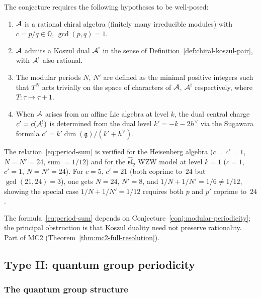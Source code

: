 \begin{remark}
\label{rem:precise-reflected-hypotheses}
The conjecture requires the following hypotheses to be well-posed:
\begin{enumerate}
\item $\mathcal{A}$ is a rational chiral algebra (finitely many irreducible modules) with $c = p/q \in \mathbb{Q}$, $\gcd(p,q) = 1$.
\item $\mathcal{A}$ admits a Koszul dual $\mathcal{A}^!$ in the sense of Definition~\ref{def:chiral-koszul-pair}, with $\mathcal{A}^!$ also rational.
\item The modular periods $N$, $N'$ are defined as the minimal positive integers such that $T^N$ acts trivially on the space of characters of $\mathcal{A}$, $\mathcal{A}^!$ respectively, where $T: \tau \mapsto \tau + 1$.
\item When $\mathcal{A}$ arises from an affine Lie algebra at level $k$, the dual central charge $c' = c(\mathcal{A}^!)$ is determined from the dual level $k' = -k - 2h^\vee$ via the Sugawara formula $c' = k'\dim(\mathfrak{g})/(k' + h^\vee)$.
\end{enumerate}
The relation~\eqref{eq:period-sum} is verified for the Heisenberg algebra ($c = c' = 1$, $N = N' = 24$, sum $= 1/12$) and for the $\widehat{\mathfrak{sl}}_2$ WZW model at level $k = 1$ ($c = 1$, $c' = 1$, $N = N' = 24$).  For $c = 5$, $c' = 21$ (both coprime to~$24$ but $\gcd(21, 24) = 3$), one gets $N = 24$, $N' = 8$, and $1/N + 1/N' = 1/6 \neq 1/12$, showing the special case $1/N + 1/N' = 1/12$ requires both $p$ and $p'$ coprime to~$24$.
\end{remark}

\begin{remark}[Scope]
The formula~\eqref{eq:period-sum} depends on Conjecture~\ref{conj:modular-periodicity}; the principal obstruction is that Koszul duality need not preserve rationality.  Part of MC2 (Theorem~\ref{thm:mc2-full-resolution}).
\end{remark}

\subsection{Type II: quantum group periodicity}

\subsubsection{The quantum group structure}

